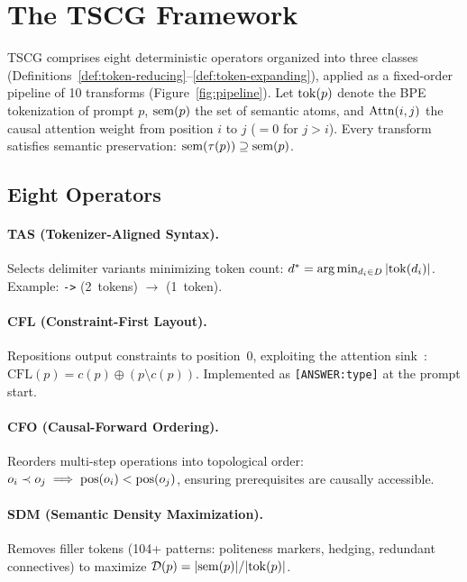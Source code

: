 \section{The TSCG Framework}
\label{sec:framework}


TSCG comprises eight deterministic operators organized into three classes (Definitions~\ref{def:token-reducing}--\ref{def:token-expanding}), applied as a fixed-order pipeline of 10 transforms (Figure~\ref{fig:pipeline}).
Let $\mathrm{tok}(p)$ denote the BPE tokenization of prompt $p$, $\mathrm{sem}(p)$ the set of semantic atoms, and $\mathrm{Attn}(i,j)$ the causal attention weight from position $i$ to $j$ ($= 0$ for $j > i$).
Every transform satisfies semantic preservation: $\mathrm{sem}(\tau(p)) \supseteq \mathrm{sem}(p)$.

\subsection{Eight Operators}

\paragraph{TAS (Tokenizer-Aligned Syntax).}
Selects delimiter variants minimizing token count: $d^* = \arg\min_{d_i \in D} |\mathrm{tok}(d_i)|$.
Example: \texttt{->} (2~tokens) $\to$ \texttt{\textrightarrow} (1~token).

\paragraph{CFL (Constraint-First Layout).}
Repositions output constraints to position~0, exploiting the attention sink~\cite{xiao2023efficient}: $\text{CFL}(p) = c(p) \oplus (p \setminus c(p))$.
Implemented as \texttt{[ANSWER:type]} at the prompt start.

\paragraph{CFO (Causal-Forward Ordering).}
Reorders multi-step operations into topological order: $o_i \prec o_j \implies \mathrm{pos}(o_i) < \mathrm{pos}(o_j)$, ensuring prerequisites are causally accessible.

\paragraph{SDM (Semantic Density Maximization).}
Removes filler tokens (104+ patterns: politeness markers, hedging, redundant connectives) to maximize $\mathcal{D}(p) = |\mathrm{sem}(p)| / |\mathrm{tok}(p)|$.

